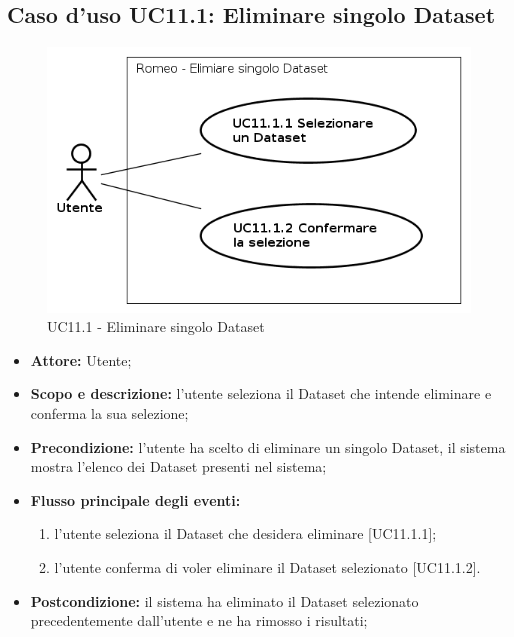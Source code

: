 \pagebreak

\subsection{Caso d'uso UC11.1: Eliminare singolo Dataset}
\begin{figure}[!h]
\begin{center}
\includegraphics[scale=0.6]{./img/Use_Case/UC11_1}
\caption{UC11.1 - Eliminare singolo Dataset}
\end{center}
\end{figure}
\begin{itemize}
\item \textbf{Attore:} Utente;
\item \textbf{Scopo e descrizione:} l'utente seleziona il Dataset\glossario{} che intende eliminare e conferma la sua selezione;
\item \textbf{Precondizione:} l'utente ha scelto di eliminare un singolo Dataset\glossario{}, il sistema mostra l'elenco dei Dataset\glossario{} presenti nel sistema;
\item \textbf{Flusso principale degli eventi:}
\begin{enumerate}
\item l'utente seleziona il Dataset\glossario{} che desidera eliminare [UC11.1.1];
\item l'utente conferma di voler eliminare il Dataset\glossario{} selezionato [UC11.1.2].
\end{enumerate}
\item \textbf{Postcondizione:} il sistema ha eliminato il Dataset\glossario{} selezionato precedentemente dall'utente e ne ha rimosso i risultati;
\end{itemize}

